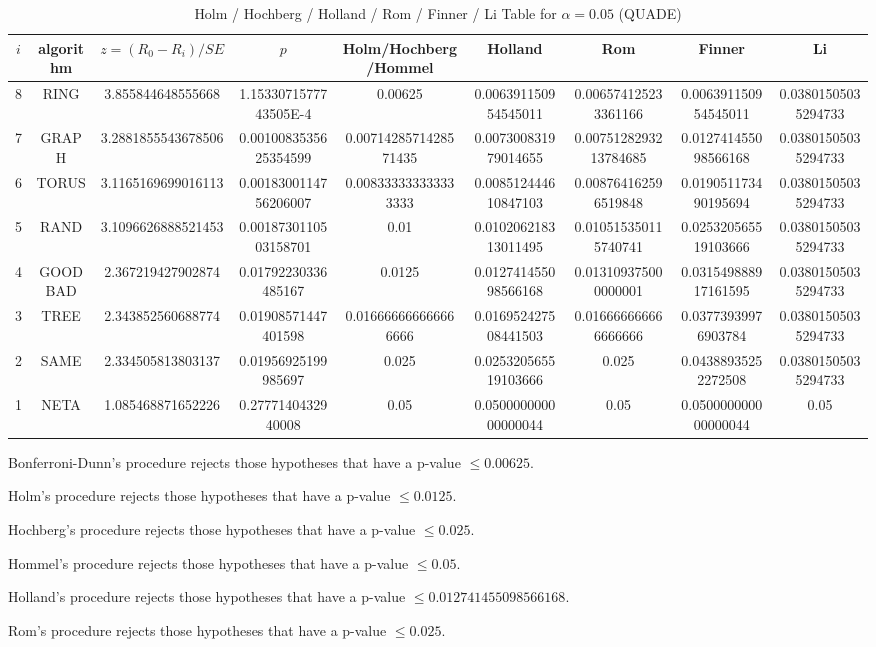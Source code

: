 \documentclass[a4paper,10pt]{article}
\begin{document}
\begin{landscape}
\begin{table}[!htp]
\centering\scriptsize
\caption{Holm / Hochberg / Holland / Rom / Finner / Li Table for $\alpha=0.05$ (QUADE)}
\begin{tabular}{ccccccccc}
$i$&algorithm&$z=(R_0 - R_i)/SE$&$p$&Holm/Hochberg/Hommel&Holland&Rom&Finner&Li\\
\hline
8& RING&3.855844648555668&1.1533071577743505E-4&0.00625&0.006391150954545011&0.006574125233361166&0.006391150954545011&0.03801505035294733\\
7& GRAPH&3.2881855543678506&0.0010083535625354599&0.0071428571428571435&0.007300831979014655&0.0075128293213784685&0.012741455098566168&0.03801505035294733\\
6& TORUS&3.1165169699016113&0.0018300114756206007&0.008333333333333333&0.008512444610847103&0.008764162596519848&0.019051173490195694&0.03801505035294733\\
5& RAND&3.1096626888521453&0.0018730110503158701&0.01&0.010206218313011495&0.010515350115740741&0.025320565519103666&0.03801505035294733\\
4& GOODBAD&2.367219427902874&0.01792230336485167&0.0125&0.012741455098566168&0.013109375000000001&0.031549888917161595&0.03801505035294733\\
3& TREE&2.343852560688774&0.01908571447401598&0.016666666666666666&0.016952427508441503&0.016666666666666666&0.03773939976903784&0.03801505035294733\\
2& SAME&2.334505813803137&0.01956925199985697&0.025&0.025320565519103666&0.025&0.04388935252272508&0.03801505035294733\\
1& NETA&1.085468871652226&0.2777140432940008&0.05&0.050000000000000044&0.05&0.050000000000000044&0.05\\
\hline
\end{tabular}
\end{table}
Bonferroni-Dunn's procedure rejects those hypotheses that have a p-value $\le0.00625$.


Holm's procedure rejects those hypotheses that have a p-value $\le0.0125$.


Hochberg's procedure rejects those hypotheses that have a p-value $\le0.025$.


Hommel's procedure rejects those hypotheses that have a p-value $\le0.05$.


Holland's procedure rejects those hypotheses that have a p-value $\le0.012741455098566168$.


Rom's procedure rejects those hypotheses that have a p-value $\le0.025$.



\end{landscape}
\end{document}
